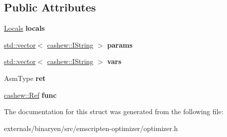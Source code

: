 \subsection*{Public Attributes}
\begin{DoxyCompactItemize}
\item 
\mbox{\label{struct_asm_data_a83dbf78c554c67dd33e62526fb2ae685}} 
\mbox{\hyperlink{classstd_1_1unordered__map}{Locals}} {\bfseries locals}
\item 
\mbox{\label{struct_asm_data_a8058c3eb21a1d6b44880ff574b24c15c}} 
\mbox{\hyperlink{classstd_1_1vector}{std\+::vector}}$<$ \mbox{\hyperlink{structcashew_1_1_i_string}{cashew\+::\+I\+String}} $>$ {\bfseries params}
\item 
\mbox{\label{struct_asm_data_a7f45d34d8fc7f4a89f4953edd40c96ea}} 
\mbox{\hyperlink{classstd_1_1vector}{std\+::vector}}$<$ \mbox{\hyperlink{structcashew_1_1_i_string}{cashew\+::\+I\+String}} $>$ {\bfseries vars}
\item 
\mbox{\label{struct_asm_data_a89ce2624982d4e35fb25d2c95b5e8fb6}} 
Asm\+Type {\bfseries ret}
\item 
\mbox{\label{struct_asm_data_a28f47eca50a0eb7c9d3d8e9b22cb50d6}} 
\mbox{\hyperlink{structcashew_1_1_ref}{cashew\+::\+Ref}} {\bfseries func}
\end{DoxyCompactItemize}


The documentation for this struct was generated from the following file\+:\begin{DoxyCompactItemize}
\item 
externals/binaryen/src/emscripten-\/optimizer/optimizer.\+h\end{DoxyCompactItemize}
